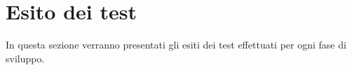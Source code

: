 \documentclass[a4paper,11pt]{article}
\begin{document}






\newpage
\section{Esito dei test}
In questa sezione verranno presentati gli esiti dei test effettuati per ogni fase di sviluppo. 
\end{document}
